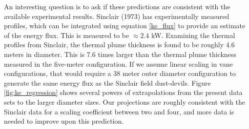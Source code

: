 \documentclass[english]{article}
\begin{document}
An interesting question is to ask if these predictions are consistent with the available experimental results. 
Sinclair (1973) has experimentally measured profiles, which can be integrated using equation \ref{ke_flux} to 
provide an estimate of the energy flux. This is measured to be $\approx 2.4$ kW. Examining the thermal 
profiles from Sinclair, the thermal plume thickness is found to be roughly 4.6 meters in diameter. This is 
7.6 times larger than the thermal plume thickness measured in the five-meter configuration. If we assume 
linear scaling in vane configurations, that would require a 38 meter outer diameter configuration to 
generate the same energy flux as the Sinclair field dust-devils. Figure \ref{fig:ke_regression} shows 
several powers of extrapolations from the present data sets to the larger diameter sizes. Our projections 
are roughly consistent with the Sinclair data for a scaling coefficient between two and four, and more data is needed
to improve upon this prediction. 
\end{document}
